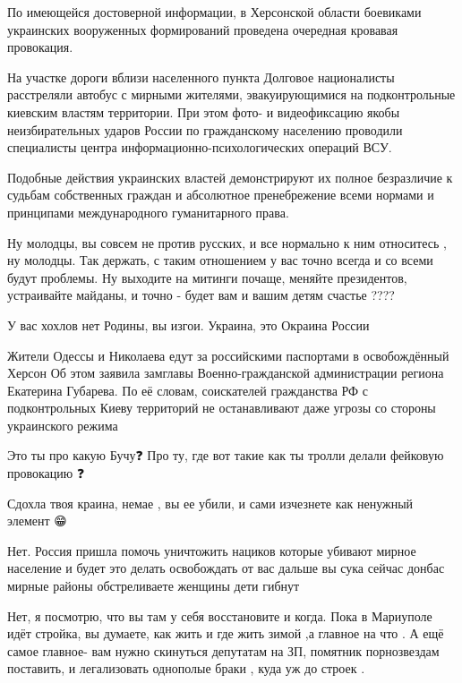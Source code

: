 По имеющейся достоверной информации, в Херсонской области боевиками украинских
вооруженных формирований проведена очередная кровавая провокация.

На участке дороги вблизи населенного пункта Долговое националисты расстреляли
автобус с мирными жителями, эвакуирующимися на подконтрольные киевским властям
территории. При этом фото- и видеофиксацию якобы неизбирательных ударов России
по гражданскому населению проводили специалисты центра
информационно-психологических операций ВСУ.

Подобные действия украинских властей демонстрируют их полное безразличие к
судьбам собственных граждан и абсолютное пренебрежение всеми нормами и
принципами международного гуманитарного права.

Ну молодцы, вы совсем не против русских, и все нормально к ним относитесь , ну
молодцы. Так держать, с таким отношением у вас точно всегда и со всеми будут
проблемы. Ну выходите на митинги почаще, меняйте президентов, устраивайте
майданы, и точно - будет вам и вашим детям счастье ????

У вас хохлов нет Родины, вы изгои. Украина, это Окраина России

Жители Одессы и Николаева едут за российскими паспортами в освобождённый Херсон
Об этом заявила замглавы Военно-гражданской администрации региона Екатерина
Губарева.  По её словам, соискателей гражданства РФ с подконтрольных Киеву
территорий не останавливают даже угрозы со стороны украинского режима

Это ты про какую Бучу❓
Про ту, где вот такие как ты тролли делали фейковую провокацию ❓

Сдохла твоя краина, немае , вы ее убили, и сами изчезнете как ненужный элемент 😁👏👏👏

Нет. Россия пришла помочь уничтожить нациков которые убивают мирное население и
будет это делать освобождать от вас дальше вы сука сейчас донбас мирные районы
обстреливаете женщины дети гибнут

Нет, я посмотрю, что вы там у себя восстановите и когда. Пока в Мариуполе идёт
стройка, вы думаете, как жить и где жить зимой ,а главное на что . А ещё самое
главное- вам нужно скинуться депутатам на ЗП, помятник порнозвездам поставить,
и легализовать однополые браки , куда уж до строек .

